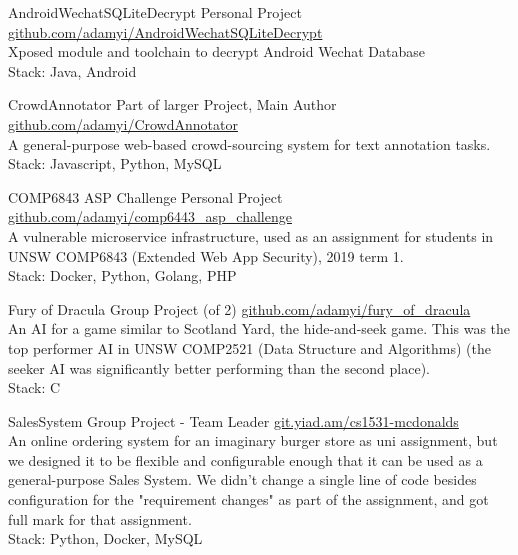 \documentclass[hidelinks__VERSION__]{adamyi-cv}
\begin{document}
\begin{entrylist}

\entry
{AndroidWechatSQLiteDecrypt}
{Personal Project}
{\href{https://github.com/adamyi/AndroidWechatSQLiteDecrypt}{github.com/adamyi/AndroidWechatSQLiteDecrypt}\\
Xposed module and toolchain to decrypt Android Wechat Database \\
Stack: Java, Android
}


\entry
{CrowdAnnotator}
{Part of larger Project, Main Author}
{\href{https://github.com/adamyi/CrowdAnnotator}{github.com/adamyi/CrowdAnnotator}\\
A general-purpose web-based crowd-sourcing system for text annotation tasks.\\
Stack: Javascript, Python, MySQL
}


\entry
{COMP6843 ASP Challenge}
{Personal Project}
{\href{https://github.com/adamyi/comp6443_asp_challenge}{github.com/adamyi/comp6443\_asp\_challenge}\\
A vulnerable microservice infrastructure, used as an assignment for students in UNSW COMP6843 (Extended Web App Security), 2019 term 1.\\
Stack: Docker, Python, Golang, PHP
}


\entry
{Fury of Dracula}
{Group Project (of 2)}
{\href{https://github.com/adamyi/fury_of_dracula}{github.com/adamyi/fury\_of\_dracula}\\
An AI for a game similar to Scotland Yard, the hide-and-seek game. This was the top performer AI in UNSW COMP2521 (Data Structure and Algorithms) (the seeker AI was significantly better performing than the second place).\\
Stack: C
}


\entry
{SalesSystem}
{Group Project - Team Leader}
{\href{https://git.yiad.am/cs1531-mcdonalds}{git.yiad.am/cs1531-mcdonalds}\\
An online ordering system for an imaginary burger store as uni assignment, but we designed it to be flexible and configurable enough that it can be used as a general-purpose Sales System. We didn't change a single line of code besides configuration for the "requirement changes" as part of the assignment, and got full mark for that assignment.\\
Stack: Python, Docker, MySQL
}


\end{entrylist}

\end{document}
